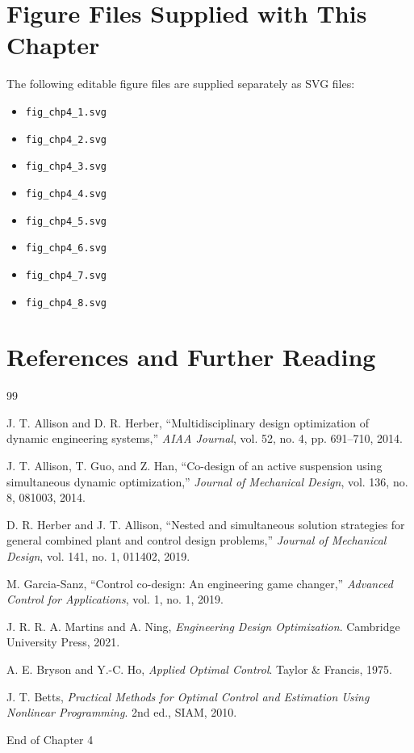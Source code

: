\documentclass[11pt]{article}
\begin{document}
\section{Figure Files Supplied with This Chapter}

The following editable figure files are supplied separately as SVG files:
\begin{itemize}[leftmargin=1.4em]
  \item \texttt{fig\_chp4\_1.svg}
  \item \texttt{fig\_chp4\_2.svg}
  \item \texttt{fig\_chp4\_3.svg}
  \item \texttt{fig\_chp4\_4.svg}
  \item \texttt{fig\_chp4\_5.svg}
  \item \texttt{fig\_chp4\_6.svg}
  \item \texttt{fig\_chp4\_7.svg}
  \item \texttt{fig\_chp4\_8.svg}
\end{itemize}

\section{References and Further Reading}

\begin{thebibliography}{99}

J. T. Allison and D. R. Herber, ``Multidisciplinary design optimization of dynamic engineering systems,'' \emph{AIAA Journal}, vol. 52, no. 4, pp. 691--710, 2014.

J. T. Allison, T. Guo, and Z. Han, ``Co-design of an active suspension using simultaneous dynamic optimization,'' \emph{Journal of Mechanical Design}, vol. 136, no. 8, 081003, 2014.

D. R. Herber and J. T. Allison, ``Nested and simultaneous solution strategies for general combined plant and control design problems,'' \emph{Journal of Mechanical Design}, vol. 141, no. 1, 011402, 2019.

M. Garcia-Sanz, ``Control co-design: An engineering game changer,'' \emph{Advanced Control for Applications}, vol. 1, no. 1, 2019.

J. R. R. A. Martins and A. Ning, \emph{Engineering Design Optimization}. Cambridge University Press, 2021.

A. E. Bryson and Y.-C. Ho, \emph{Applied Optimal Control}. Taylor \& Francis, 1975.

J. T. Betts, \emph{Practical Methods for Optimal Control and Estimation Using Nonlinear Programming}. 2nd ed., SIAM, 2010.

\end{thebibliography}

\vfill
\begin{center}
\small\color{CCDgray}
End of Chapter 4
\end{center}
\end{document}

